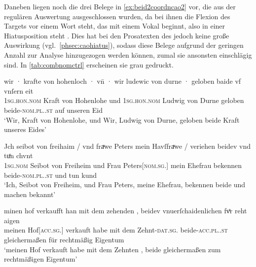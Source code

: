Daneben liegen noch die drei Belege in \cref{ex:beid2coordncao2} vor, die aus
der regulären Auswertung ausgeschlossen wurden, da bei ihnen die Flexion des
Targets vor einem Wort steht, das mit einem Vokal beginnt, also in einer
Hiatusposition steht \autocites[vgl.][90--91]{askedal1973}[191--193,
201]{gjelsten1980}. Dies hat bei den Prosatexten des \CAO{} jedoch
keine große Auswirkung (vgl.~\cref{phsec:caohiatus}), sodass diese Belege
aufgrund der geringen Anzahl zur Analyse hinzugezogen werden können, zumal sie
ansonsten einschlägig sind. In \cref{tab:combnomctrl} erscheinen sie grau
gedruckt.

\begin{exe}
\ex \label{ex:beid2coordncao2}
	\begin{xlist}
	\ex \label{ex:beid2coordncao2_1}
		\gll wir · krafte von hohenloch · vn̄ · wir ludewic
			von durne · geloben baide vf vnſern eit \\
			\textsc{1sg\subM.hon.nom} {} Kraft von Hohenlohe {} und {}
			\textsc{1sg\subM.hon.nom} Ludwig von Durne {} geloben
			beide-\textsc{nom.pl.\MascM.st} auf unseren Eid \\
		\trans `Wir, Kraft von Hohenlohe, und Wir, Ludwig von Durne,
			geloben beide Kraft unseres Eides'
			\parencites(Nr.~2529, Burg Hohlach, Kr.~Neustadt an der Aisch-Bad Windsheim)[563,5--6]{cao3}

	\ex \label{ex:beid2coordncao2_2}
		\gll Jch seibot von freihaim / vnd fraͮwe Peters mein
			Havſfraͮwe / veriehen beidev vnd tuͦn chvnt \\
			\textsc{1sg\subM.nom} Seibot von Freiheim {} und Frau
			Peters[\textsc{nom.sg.\FemF}] mein Ehefrau {} bekennen
			beide-\textsc{nom.pl.\NeutMF.st} und tun kund \\
		\trans `Ich, Seibot von Freiheim, und Frau Peters, meine Ehefrau,
			bekennen beide und machen bekannt'
			\parencites(Nr.~3248, München, 1299)[416,23]{cao4}

	\ex \label{ex:beid2coordncao2_3}
		\gll minen hof \textelp{} verkaufft han mit dem
			zehenden \textelp{}, beidev vnuerſchaidenlichen
			fvͤr reht aigen \\
			meinen Hof[\textsc{acc.sg.\MascI}] {} verkauft habe mit dem
			Zehnt-\textsc{dat.sg.\MascI} {} beide-\textsc{acc.pl.\NeutI.st}
			gleichermaßen für rechtmäßig Eigentum \\
		\trans `meinen Hof verkauft habe mit dem Zehnten \textelp{}, beide
			gleichermaßen zum rechtmäßigen Eigentum'
			\parencites(Nr.~N~241, Augsburg, 1283)[195,37--39]{cao5}
	\end{xlist}
\end{exe}

